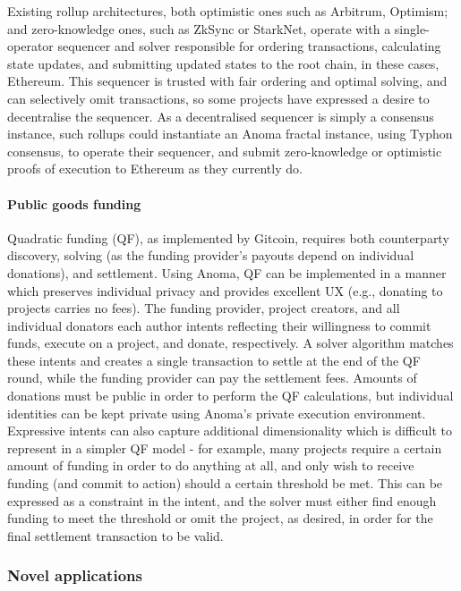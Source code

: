 \documentclass[
    9pt,            %
    commun,        %
    affiltop,       %
]{art}
\begin{document}
Existing rollup architectures, both optimistic ones such as Arbitrum,
Optimism; and zero-knowledge ones, such as ZkSync or StarkNet, operate
with a single-operator sequencer and solver responsible for ordering
transactions, calculating state updates, and submitting updated states
to the root chain, in these cases, Ethereum. This sequencer is trusted
with fair ordering and optimal solving, and can selectively omit
transactions, so some projects have expressed a desire to decentralise
the sequencer. As a decentralised sequencer is simply a consensus
instance, such rollups could instantiate an Anoma fractal instance,
using Typhon consensus, to operate their sequencer, and submit
zero-knowledge or optimistic proofs of execution to Ethereum as they
currently do.

\paragraph{Public goods funding}\label{public-goods-funding}

Quadratic funding (QF), as implemented by Gitcoin, requires both
counterparty discovery, solving (as the funding
provider's payouts depend on individual donations), and
settlement. Using Anoma, QF can be implemented in a manner which
preserves individual privacy and provides excellent UX (e.g., donating
to projects carries no fees). The funding provider, project creators,
and all individual donators each author intents reflecting their
willingness to commit funds, execute on a project, and donate,
respectively. A solver algorithm matches these intents and creates a
single transaction to settle at the end of the QF round, while the
funding provider can pay the settlement fees. Amounts of donations must
be public in order to perform the QF calculations, but individual
identities can be kept private using Anoma's private
execution environment. Expressive intents can also capture additional
dimensionality which is difficult to represent in a simpler QF model -
for example, many projects require a certain amount of funding in order
to do anything at all, and only wish to receive funding (and commit to
action) should a certain threshold be met. This can be expressed as a
constraint in the intent, and the solver must either find enough funding
to meet the threshold or omit the project, as desired, in order for the
final settlement transaction to be valid.

\subsubsection{Novel applications}\label{novel-applications}
\end{document}

